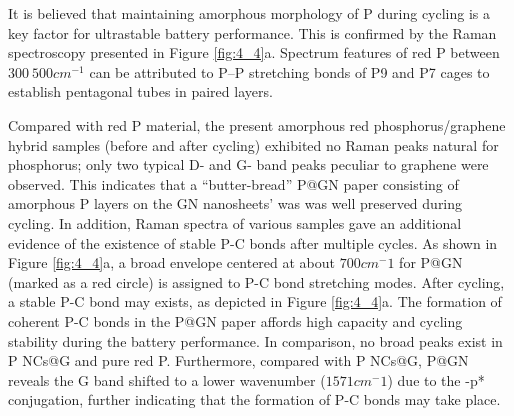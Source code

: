 It is believed that maintaining amorphous morphology of P during cycling is a key factor for ultrastable battery performance. 
This is confirmed by the Raman spectroscopy presented in Figure \ref{fig:4_4}a. 
Spectrum features of red P between $300~500 cm^{-1}$ can be attributed to P–P stretching bonds of P9 and P7 cages to establish pentagonal tubes in paired layers.

Compared with red P material, the present amorphous red phosphorus/graphene hybrid samples (before and after cycling) exhibited no Raman peaks natural for phosphorus; only two typical D- and G- band peaks peculiar to graphene were observed.\cite{Kim2013c} This indicates that a “butter-bread” P@GN paper consisting of amorphous P layers on the GN nanosheets’ was was well preserved during cycling. In addition, Raman spectra of various samples gave an additional evidence of the existence of stable P-C bonds after multiple cycles. As shown in Figure \ref{fig:4_4}a, a broad envelope centered at about $700 cm^-1$ for P@GN (marked as a red circle) is assigned to P-C bond stretching modes. After cycling, a stable P-C bond may exists, as depicted in Figure \ref{fig:4_4}a. The formation of coherent P-C bonds in the P@GN paper affords high capacity and cycling stability during the battery performance. In comparison, no broad peaks exist in P NCs@G and pure red P. Furthermore, compared with P NCs@G, P@GN reveals the G band shifted to a lower wavenumber ($1571 cm^-1$) due to the \pi-p* conjugation, further indicating that the formation of P-C bonds may take place. \\
